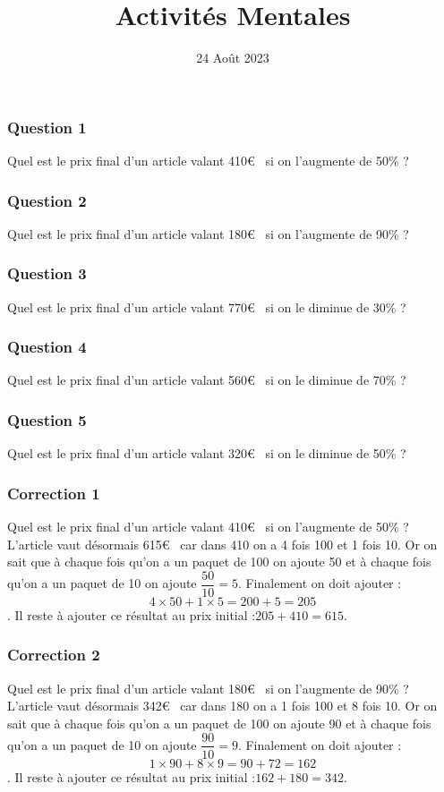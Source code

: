 \documentclass[15pt, mathserif]{beamer}
\title{Activités Mentales}
\date{24 Août 2023}
\begin{document}
\begin{frame}
    \titlepage
\end{frame}

\begin{frame} 
	\frametitle{Question 1}
Quel est le prix final d'un article valant 410\euro ~ si on l'augmente de 50\% ?\end{frame}


\begin{frame} 
	\frametitle{Question 2}
Quel est le prix final d'un article valant 180\euro ~ si on l'augmente de 90\% ?\end{frame}


\begin{frame} 
	\frametitle{Question 3}
Quel est le prix final d'un article valant 770\euro ~ si on le diminue de 30\% ?\end{frame}


\begin{frame} 
	\frametitle{Question 4}
Quel est le prix final d'un article valant 560\euro ~ si on le diminue de 70\% ?\end{frame}


\begin{frame} 
	\frametitle{Question 5}
Quel est le prix final d'un article valant 320\euro ~ si on le diminue de 50\% ?\end{frame}


\begin{frame}
\vspace{-10mm}
	\frametitle{Correction 1}
Quel est le prix final d'un article valant 410\euro ~ si on l'augmente de 50\% ? \\ L'article vaut désormais 615\euro ~ car dans 410 on a 4 fois 100 et 1 fois 10. Or on sait que à chaque fois qu'on a un paquet de 100 on ajoute 50 et à chaque fois qu'on a un paquet de 10 on ajoute $\dfrac{50}{10}=5$. Finalement on doit ajouter : $$4\times 50 + 1\times5 = 200+5=205$$. Il reste à ajouter ce résultat au prix initial :$205+410=615$.\end{frame}


\begin{frame}
\vspace{-10mm}
	\frametitle{Correction 2}
Quel est le prix final d'un article valant 180\euro ~ si on l'augmente de 90\% ? \\ L'article vaut désormais 342\euro ~ car dans 180 on a 1 fois 100 et 8 fois 10. Or on sait que à chaque fois qu'on a un paquet de 100 on ajoute 90 et à chaque fois qu'on a un paquet de 10 on ajoute $\dfrac{90}{10}=9$. Finalement on doit ajouter : $$1\times 90 + 8\times9 = 90+72=162$$. Il reste à ajouter ce résultat au prix initial :$162+180=342$.\end{frame}
\end{document}
